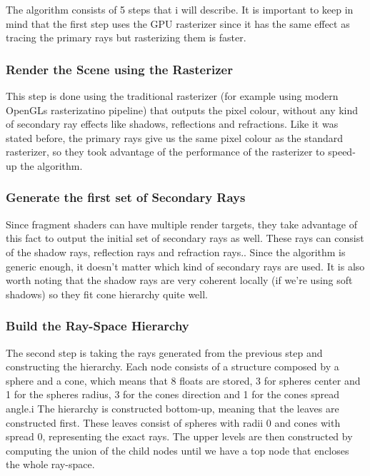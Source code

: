 \documentclass{llncs}
\begin{document}
\medskip

The algorithm consists of 5 steps that i will describe. It is important to keep in mind that the first step uses the GPU rasterizer since it has the same effect as tracing the primary rays but rasterizing them is faster.

\subsubsection{Render the Scene using the Rasterizer}

This step is done using the traditional rasterizer (for example using modern OpenGLs rasterizatino pipeline) that outputs the pixel colour, without any kind of secondary ray effects like shadows,  reflections and refractions. Like it was stated  before, the primary rays give us the same pixel colour as the standard rasterizer, so they took advantage of the performance of the rasterizer to speed-up the algorithm.

\subsubsection{Generate the first set of Secondary Rays}

Since fragment shaders can have multiple render targets, they take advantage of this fact to output the initial set of secondary rays as well. These rays can consist of the shadow rays, reflection rays and refraction rays.. Since the algorithm is generic enough, it doesn't matter which kind of secondary rays are used. It is also worth noting that the shadow rays are very coherent locally (if we're using soft shadows) so they fit cone hierarchy quite well.

\subsubsection{Build the Ray-Space Hierarchy}

The second step is taking the rays generated from the previous step and constructing the hierarchy. Each node consists of a structure composed by a sphere and a cone, which means that 8 floats are stored, 3 for spheres center and 1 for the spheres radius, 3 for the cones direction and 1 for the cones spread angle.i The hierarchy is constructed bottom-up, meaning that the leaves are constructed first. These leaves consist of spheres with radii 0 and cones with spread 0, representing the exact rays. The upper levels are then constructed by computing the union of the child nodes until we have a top node that encloses the whole ray-space.
\end{document}
